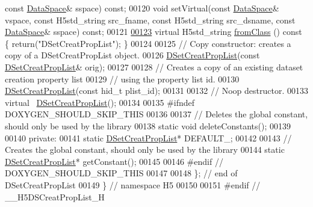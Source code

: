 \begin{DoxyCode}
{      const} \hyperlink{class_h5_1_1_data_space}{DataSpace}& sspace) \textcolor{keyword}{const};
00120         \textcolor{keywordtype}{void} setVirtual(\textcolor{keyword}{const} \hyperlink{class_h5_1_1_data_space}{DataSpace}& vspace, \textcolor{keyword}{const} H5std\_string src\_fname, \textcolor{keyword}{const} H5std\_string 
      src\_dsname, \textcolor{keyword}{const} \hyperlink{class_h5_1_1_data_space}{DataSpace}& sspace) \textcolor{keyword}{const};
00121 
\hyperlink{class_h5_1_1_d_set_creat_prop_list_aae0bda38c97a2ab85679caad38c4bb87}{00123}         \textcolor{keyword}{virtual} H5std\_string \hyperlink{class_h5_1_1_d_set_creat_prop_list_aae0bda38c97a2ab85679caad38c4bb87}{fromClass} ()\textcolor{keyword}{ const }\{ \textcolor{keywordflow}{return}(\textcolor{stringliteral}{"DSetCreatPropList"}); \}
00124 
00125         \textcolor{comment}{// Copy constructor: creates a copy of a DSetCreatPropList object.}
00126         \hyperlink{class_h5_1_1_d_set_creat_prop_list}{DSetCreatPropList}(\textcolor{keyword}{const} \hyperlink{class_h5_1_1_d_set_creat_prop_list}{DSetCreatPropList}& orig);
00127 
00128         \textcolor{comment}{// Creates a copy of an existing dataset creation property list}
00129         \textcolor{comment}{// using the property list id.}
00130         \hyperlink{class_h5_1_1_d_set_creat_prop_list}{DSetCreatPropList}(\textcolor{keyword}{const} hid\_t plist\_id);
00131 
00132         \textcolor{comment}{// Noop destructor.}
00133         \textcolor{keyword}{virtual} ~\hyperlink{class_h5_1_1_d_set_creat_prop_list}{DSetCreatPropList}();
00134 
00135 \textcolor{preprocessor}{#ifndef DOXYGEN\_SHOULD\_SKIP\_THIS}
00136 
00137         \textcolor{comment}{// Deletes the global constant, should only be used by the library}
00138         \textcolor{keyword}{static} \textcolor{keywordtype}{void} deleteConstants();
00139 
00140     \textcolor{keyword}{private}:
00141         \textcolor{keyword}{static} \hyperlink{class_h5_1_1_d_set_creat_prop_list}{DSetCreatPropList}* DEFAULT\_;
00142 
00143         \textcolor{comment}{// Creates the global constant, should only be used by the library}
00144         \textcolor{keyword}{static} \hyperlink{class_h5_1_1_d_set_creat_prop_list}{DSetCreatPropList}* getConstant();
00145 
00146 \textcolor{preprocessor}{#endif // DOXYGEN\_SHOULD\_SKIP\_THIS}
00147 
00148 \}; \textcolor{comment}{// end of DSetCreatPropList}
00149 \} \textcolor{comment}{// namespace H5}
00150 
00151 \textcolor{preprocessor}{#endif // \_\_H5DSCreatPropList\_H}
\end{DoxyCode}
